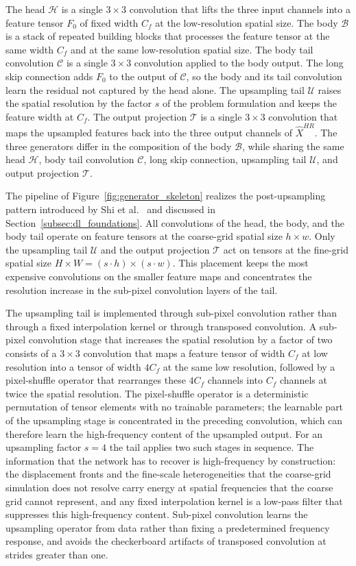 The head $\mathcal{H}$ is a single $3 \times 3$ convolution that lifts the three input channels into a feature tensor $F_0$ of fixed width $C_f$ at the low-resolution spatial size. The body $\mathcal{B}$ is a stack of repeated building blocks that processes the feature tensor at the same width $C_f$ and at the same low-resolution spatial size. The body tail convolution $\mathcal{C}$ is a single $3 \times 3$ convolution applied to the body output. The long skip connection adds $F_0$ to the output of $\mathcal{C}$, so the body and its tail convolution learn the residual not captured by the head alone. The upsampling tail $\mathcal{U}$ raises the spatial resolution by the factor $s$ of the problem formulation and keeps the feature width at $C_f$. The output projection $\mathcal{T}$ is a single $3 \times 3$ convolution that maps the upsampled features back into the three output channels of $\widehat{X}^{HR}$. The three generators differ in the composition of the body $\mathcal{B}$, while sharing the same head $\mathcal{H}$, body tail convolution $\mathcal{C}$, long skip connection, upsampling tail $\mathcal{U}$, and output projection $\mathcal{T}$.

The pipeline of Figure~\ref{fig:generator_skeleton} realizes the post-upsampling pattern introduced by Shi et al.~\cite{shi2016real} and discussed in Section~\ref{subsec:dl_foundations}. All convolutions of the head, the body, and the body tail operate on feature tensors at the coarse-grid spatial size $h \times w$. Only the upsampling tail $\mathcal{U}$ and the output projection $\mathcal{T}$ act on tensors at the fine-grid spatial size $H \times W = (s \cdot h) \times (s \cdot w)$. This placement keeps the most expensive convolutions on the smaller feature maps and concentrates the resolution increase in the sub-pixel convolution layers of the tail.

The upsampling tail is implemented through sub-pixel convolution rather than through a fixed interpolation kernel or through transposed convolution. A sub-pixel convolution stage that increases the spatial resolution by a factor of two consists of a $3 \times 3$ convolution that maps a feature tensor of width $C_f$ at low resolution into a tensor of width $4 C_f$ at the same low resolution, followed by a pixel-shuffle operator that rearranges these $4 C_f$ channels into $C_f$ channels at twice the spatial resolution. The pixel-shuffle operator is a deterministic permutation of tensor elements with no trainable parameters; the learnable part of the upsampling stage is concentrated in the preceding convolution, which can therefore learn the high-frequency content of the upsampled output. For an upsampling factor $s = 4$ the tail applies two such stages in sequence. The information that the network has to recover is high-frequency by construction: the displacement fronts and the fine-scale heterogeneities that the coarse-grid simulation does not resolve carry energy at spatial frequencies that the coarse grid cannot represent, and any fixed interpolation kernel is a low-pass filter that suppresses this high-frequency content. Sub-pixel convolution learns the upsampling operator from data rather than fixing a predetermined frequency response, and avoids the checkerboard artifacts of transposed convolution at strides greater than one.

